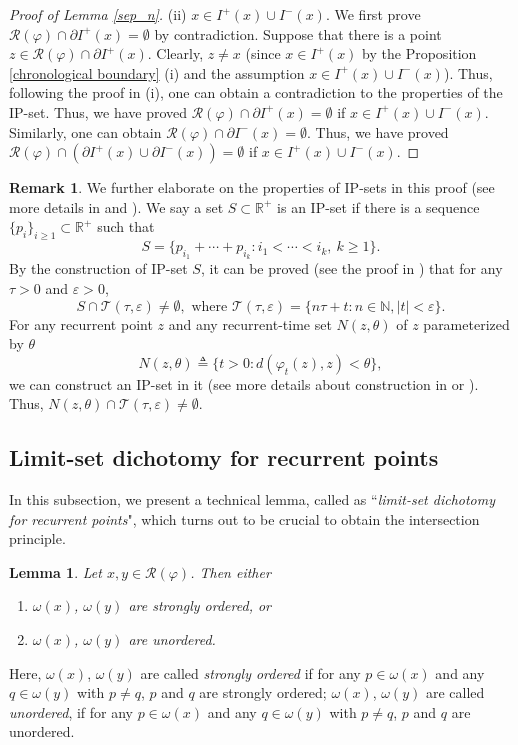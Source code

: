 \documentclass[a4paper,11pt]{article}
\theoremstyle{plain}
\newtheorem{lem}[thm]{Lemma}
\theoremstyle{definition}
\newtheorem{rmk}[thm]{Remark}
\numberwithin{equation}{section}
\begin{document}
\begin{proof}[Proof of Lemma \ref{sep_n}]
    (ii) $x\in  I^{+}(x)\cup I^{-}(x)$. We first prove $\mathcal{R}(\varphi)\cap \partial  I^{+}(x)=\emptyset$ by contradiction. Suppose that there is a point $z\in \mathcal{R}(\varphi)\cap\partial  I^{+}(x)$. Clearly, $z\neq x$ (since $x\in I^{+}(x)$ by the Proposition \ref{chronological boundary} (i) and the assumption $x\in I^{+}(x)\cup I^{-}(x)$). Thus, following the proof in (i), one can obtain a contradiction to the properties of the IP-set. Thus, we have proved $\mathcal{R}(\varphi)\cap \partial  I^{+}(x)=\emptyset$ if $x\in I^{+}(x)\cup I^{-}(x)$. Similarly, one can obtain $\mathcal{R}(\varphi)\cap \partial  I^{-}(x)=\emptyset$. Thus, we have proved $\mathcal{R}(\varphi)\cap (\partial  I^{+}(x)\cup \partial  I^{-}(x))=\emptyset$ if $x\in I^{+}(x)\cup I^{-}(x)$.	
\end{proof}

\begin{rmk}
    We further elaborate on the properties of IP-sets in this proof (see more details in \cite[Appendix A]{SWZ-25} and \cite{F81}). We say a set $S\subset\mathbb{R}^+$ is an IP-set if there is a sequence $\{p_i\}_{i\geq1}\subset\mathbb{R}^+$ such that $$S =\{ p_{i_1} + \cdots + p_{i_k} : i_1 < \cdots < i_k,\ k \ge 1\}.$$ By the construction of IP-set $S$, it can be proved (see the proof in \cite[Appendix A]{SWZ-25}) that for any $\tau>0$ and $\varepsilon>0$, $$S\cap \mathcal{T}(\tau,\varepsilon)\neq\emptyset, \text{ where } \mathcal{T}(\tau,\varepsilon)=\{n\tau+t:n\in\mathbb{N},|t|<\varepsilon\}.$$ For any recurrent point $z$ and any recurrent-time set $N(z,\theta)$ of $z$ parameterized by $\theta$ $$N(z,\theta)\triangleq\{t>0: d(\varphi_{t}(z),z)<\theta\},$$ we can construct an IP-set in it (see more details about construction in \cite[Appendix A]{SWZ-25} or \cite[Proposition 8.10]{F81}). Thus, $N(z,\theta)\cap \mathcal{T}(\tau,\varepsilon)\neq\emptyset$.
\end{rmk}

\subsection{Limit-set dichotomy for recurrent points}\label{s3.3}
In this subsection, we present a technical lemma, called as ``\textit{limit-set dichotomy for recurrent points}", which turns out to be crucial to obtain the intersection principle.

\begin{lem}\label{limit_set_dichotomy}
	Let $x,y\in \mathcal{R}(\varphi)$. Then either \begin{enumerate}[{\rm (i)}]
	\item $\omega(x)$, $\omega(y)$ are strongly ordered, or
    \item $\omega(x)$, $\omega(y)$ are unordered.
    \end{enumerate}
\end{lem}
Here, $\omega(x)$, $\omega(y)$ are called \textit {strongly ordered} if for any $p\in \omega(x)$ and any $q\in \omega(y)$ with $p\neq q$, $p$ and $q$ are strongly ordered; $\omega(x)$, $\omega(y)$ are called \textit{unordered}, if for any $p\in \omega(x)$ and any $q\in \omega(y)$ with $p\neq q$, $p$ and $q$ are unordered.
\end{document}
